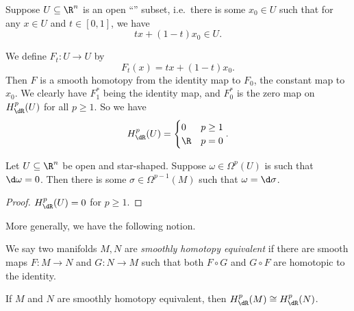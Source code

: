 \documentclass[a4paper]{article}
\begin{document}
\begin{eg}
  Suppose $U \subseteq \R^n$ is an open ``'' subset, i.e.\ there is some $x_0 \in U$ such that for any $x \in U$ and $t \in [0, 1]$, we have
  \[
    tx + (1 - t)x_0 \in U.
  \]
  \begin{center}
  \end{center}
  We define $F_t: U \to U$ by
  \[
    F_t(x) = tx + (1 - t) x_0.
  \]
  Then $F$ is a smooth homotopy from the identity map to $F_0$, the constant map to $x_0$. We clearly have $F_1^*$ being the identity map, and $F_0^*$ is the zero map on $H^p_{\dR}(U)$ for all $p \geq 1$. So we have
  \[
    H_{\dR}^p(U) =
    \begin{cases}
      0 & p \geq 1\\
      \R & p = 0
    \end{cases}.
  \]
\end{eg}

\begin{cor}
  Let $U \subseteq \R^n$ be open and star-shaped. Suppose $\omega \in \Omega^p(U)$ is such that $\d \omega = 0$. Then there is some $\sigma \in \Omega^{p - 1}(M)$ such that $\omega = \d \sigma$.
\end{cor}

\begin{proof}
  $H^p_{\dR}(U) = 0$ for $p \geq 1$.
\end{proof}

More generally, we have the following notion.

\begin{defi}
  We say two manifolds $M, N$ are \emph{smoothly homotopy equivalent} if there are smooth maps $F: M \to N$ and $G: N \to M$ such that both $F \circ G$ and $G \circ F$ are homotopic to the identity.
\end{defi}

\begin{cor}
  If $M$ and $N$ are smoothly homotopy equivalent, then $H_{\dR}^p(M) \cong H_{\dR}^p(N)$.
\end{cor}
\end{document}
